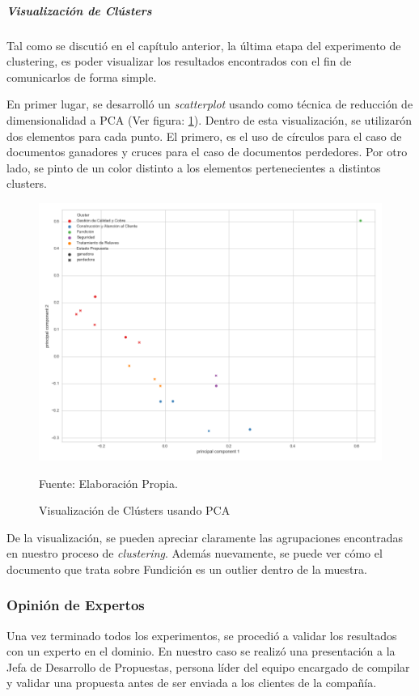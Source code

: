 \subparagraph{Visualización de Clústers}
    Tal como se discutió en el capítulo anterior, la última etapa del experimento de clustering, es poder visualizar los resultados encontrados con el fin de comunicarlos de forma simple. 
    
    En primer lugar, se desarrolló un \textit{scatterplot} usando como técnica de reducción de dimensionalidad a PCA (Ver figura: \ref{fig:PCA}). Dentro de esta visualización, se utilizarón dos elementos para cada punto. El primero, es el uso de círculos para el caso de documentos ganadores y cruces para el caso de documentos perdedores. Por otro lado, se pinto de un color distinto a los elementos pertenecientes a distintos clusters.
    
    \begin{figure}[H]
        \centering
        \includegraphics[width=1\textwidth]{figures/Clustering/PCA.png}
        \caption{\label{fig:PCA} Visualización de Clústers usando PCA} Fuente: Elaboración Propia.
    \end{figure}
    
    De la visualización, se pueden apreciar claramente las agrupaciones encontradas en nuestro proceso de \textit{clustering}. Además nuevamente, se puede ver cómo el documento que trata sobre Fundición es un outlier dentro de la muestra. 
    
\subsubsection{Opinión de Expertos}
    Una vez terminado todos los experimentos, se procedió a validar los resultados con un experto en el dominio. En nuestro caso se realizó una presentación a la Jefa de Desarrollo de Propuestas, persona líder del equipo encargado de compilar y validar una propuesta antes de ser enviada a los clientes de la compañía.
    
